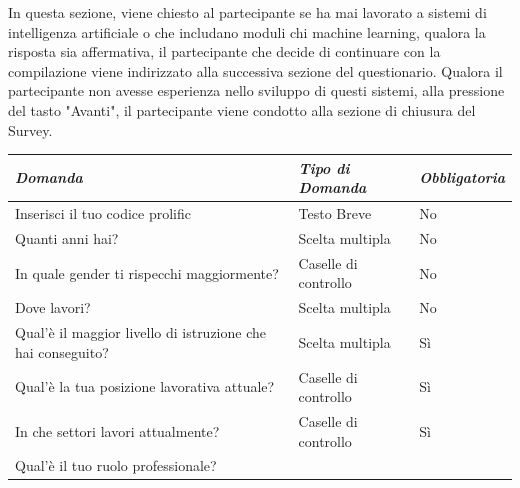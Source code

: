    In questa sezione, viene chiesto al partecipante se ha mai lavorato a sistemi di intelligenza artificiale o che includano moduli chi machine learning, qualora la risposta sia affermativa, il partecipante che decide di continuare con la compilazione viene indirizzato alla successiva sezione del questionario. Qualora il partecipante non avesse esperienza nello sviluppo di questi sistemi, alla pressione del tasto "Avanti", il partecipante viene condotto alla sezione di chiusura del Survey.
   
   \begin{longtable}{| p{} | p{} | p{} |} 
\hline\textbf{\textit{Domanda}} & \textbf{\textit{Tipo di Domanda}} & \textbf{\textit{Obbligatoria}}\\
\hline
\endhead 

\hline 
 Inserisci il tuo codice prolific

& Testo Breve

& No 

\\ \hline
\rowcolor{Gray}
Quanti anni hai?        

&  Scelta multipla

& No

\\ \hline

 In quale gender ti rispecchi maggiormente?

& Caselle di controllo

& No

\\ \hline
\rowcolor{Gray}
Dove lavori?        

&  Scelta multipla

& No
\\ \hline


 Qual'è il maggior livello di istruzione che hai conseguito?

& Scelta multipla

& Sì

\\ \hline
\rowcolor{Gray}
Qual'è la tua posizione lavorativa attuale?        

&  Caselle di controllo

& Sì

\\ \hline
In che settori lavori attualmente?        

&  Caselle di controllo

& Sì

\\ \hline
\rowcolor{Gray}
Qual'è il tuo ruolo professionale?        


\end{longtable}
